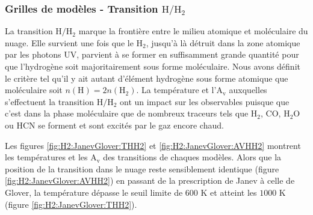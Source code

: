 \subsubsection{Grilles de modèles - Transition $\mathrm{H}/\mathrm{H}_2$}

La transition $\mathrm{H}/\mathrm{H}_2$ marque la frontière entre le milieu atomique et moléculaire du nuage. Elle survient une fois que le $\mathrm{H}_2$, jusqu'à là détruit dans la zone atomique par les photons UV, parvient à se former en suffisamment grande quantité pour que l'hydrogène soit majoritairement sous forme moléculaire. Nous avons définit le critère tel qu'il y ait autant d'élément hydrogène sous forme atomique que moléculaire soit $n(\mathrm{H}) = 2 n(\mathrm{H}_2)$. La température et l'$\mathrm{A}_\mathrm{v}$ auxquelles s'effectuent la transition $\mathrm{H}/\mathrm{H}_2$ ont un impact sur les observables puisque que c'est dans la phase moléculaire que de nombreux traceurs tels que $\mathrm{H}_2$,  $\mathrm{CO}$, $\mathrm{H}_2\mathrm{O}$ ou $\mathrm{HCN}$ se forment et sont excités par le gaz encore chaud. \newline

Les figures \ref{fig:H2:JanevGlover:THH2} et \ref{fig:H2:JanevGlover:AVHH2} montrent les températures et les $\mathrm{A}_\mathrm{v}$ des transitions de chaques modèles. Alors que la position de la transition dans le nuage reste sensiblement identique (figure \ref{fig:H2:JanevGlover:AVHH2}) en passant de la prescription de Janev à celle de Glover, la température dépasse le seuil limite de $600$ K et atteint les $1000$ K (figure \ref{fig:H2:JanevGlover:THH2}).


